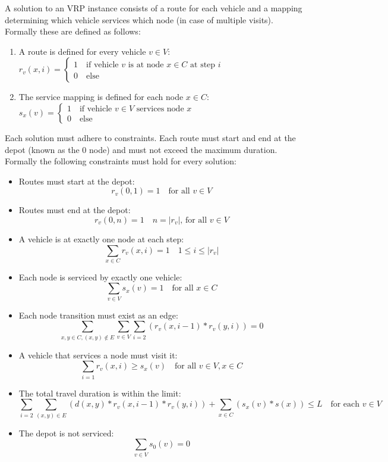 \documentclass[12pt, letterpaper]{article}
\begin{document}
A solution to an VRP instance consists of a route for each vehicle and a mapping determining which vehicle services which node (in case of multiple visits). Formally these are defined as follows:

\begin{enumerate}
	\item A route is defined for every vehicle $v \in V$: \\
		$r_v(x,i) =
		\begin{cases}
			1	\quad \text{if vehicle } v \text{ is at node } x \in C \text{ at step } i\\
			0	\quad \text{else}
		\end{cases}
		$
	\item The service mapping is defined for each node $x \in C$: \\
		$s_x(v) =
		\begin{cases}
			1	\quad \text{if vehicle } v \in V \text{ services node } x\\
			0	\quad \text{else}
		\end{cases}
		$
\end{enumerate}

Each solution must adhere to constraints. Each route must start and end at the depot (known as the 0 node) and must not exceed the maximum duration. Formally the following constraints must hold for every solution:
\begin{itemize}
	\item Routes must start at the depot:
		$$r_v(0,1) = 1 \quad \text{for all } v \in V$$
	\item Routes must end at the depot:
		$$r_v(0,n) = 1 \quad n = |r_v| \text{, for all } v \in V$$
	\item A vehicle is at exactly one node at each step: 
		$$\sum_{x \in C} r_v(x,i) = 1 \quad 1 \leq i \leq |r_v|$$
	\item Each node is serviced by exactly one vehicle:
		$$\sum_{v \in V} s_x(v) = 1 \quad \text{for all } x \in C$$
	\item Each node transition must exist as an edge: 
		$$\sum_{x,y \in C, (x,y) \not\in E} \sum_{v \in V} \sum_{i=2} (r_v(x,i-1) * r_v(y,i)) = 0 $$
	\item A vehicle that services a node must visit it: 
		$$\sum_{i=1} r_v(x,i) \geq s_x(v) \quad \text{for all } v \in V, x \in C $$
	\item The total travel duration is within the limit: 
		$$\sum_{i=2} \sum_{(x,y) \in E} (d(x,y) * r_v(x,i-1) * r_v(y,i)) + \sum_{x \in C}(s_x(v) * s(x)) \leq L \quad \text{for each } v \in V$$
	\item The depot is not serviced: 
		$$\sum_{v \in V}s_0(v) = 0$$

\end{itemize}
\end{document}
